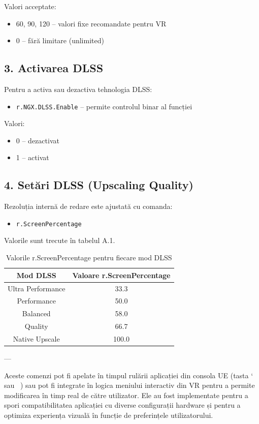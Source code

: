 Valori acceptate:
\begin{itemize}
    \item 60, 90, 120 – valori fixe recomandate pentru VR
    \item 0 – fără limitare (unlimited)
\end{itemize}

\subsection*{3. Activarea DLSS}
Pentru a activa sau dezactiva tehnologia DLSS:
\begin{itemize}
    \item \texttt{r.NGX.DLSS.Enable} – permite controlul binar al funcției
\end{itemize}

Valori:
\begin{itemize}
    \item 0 – dezactivat
    \item 1 – activat
\end{itemize}

\subsection*{4. Setări DLSS (Upscaling Quality)}
Rezoluția internă de redare este ajustată cu comanda:
\begin{itemize}
    \item \texttt{r.ScreenPercentage}
\end{itemize}
Valorile sunt trecute în tabelul A.1.
\begin{table}[htbp]
\centering
\begin{tabular}{|c|c|}
\hline
\textbf{Mod DLSS} & \textbf{Valoare r.ScreenPercentage} \\
\hline
Ultra Performance & 33.3 \\
Performance       & 50.0 \\
Balanced          & 58.0 \\
Quality           & 66.7 \\
Native Upscale    & 100.0 \\
\hline
\end{tabular}
\caption{Valorile r.ScreenPercentage pentru fiecare mod DLSS}
\label{tab:screenpercentage}
\end{table}


---

Aceste comenzi pot fi apelate în timpul rulării aplicației din consola UE (tasta ` sau ~) sau pot fi integrate în logica meniului interactiv din VR pentru a permite modificarea în timp real de către utilizator. Ele au fost implementate pentru a spori compatibilitatea aplicației cu diverse configurații hardware și pentru a optimiza experiența vizuală în funcție de preferințele utilizatorului.
